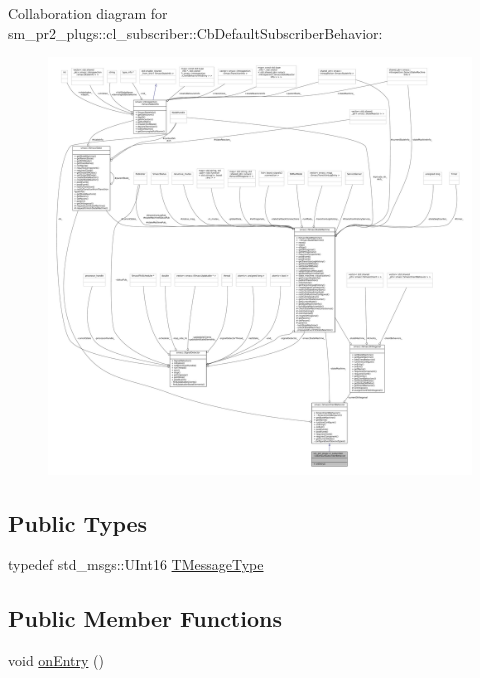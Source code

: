 Collaboration diagram for sm\+\_\+pr2\+\_\+plugs\+:\+:cl\+\_\+subscriber\+:\+:Cb\+Default\+Subscriber\+Behavior\+:
\nopagebreak
\begin{figure}[H]
\begin{center}
\leavevmode
\includegraphics[width=350pt]{classsm__pr2__plugs_1_1cl__subscriber_1_1CbDefaultSubscriberBehavior__coll__graph}
\end{center}
\end{figure}
\subsection*{Public Types}
\begin{DoxyCompactItemize}
\item 
typedef std\+\_\+msgs\+::\+U\+Int16 \hyperlink{classsm__pr2__plugs_1_1cl__subscriber_1_1CbDefaultSubscriberBehavior_a4f33f416661cd0fcde78377bad0070fb}{T\+Message\+Type}
\end{DoxyCompactItemize}
\subsection*{Public Member Functions}
\begin{DoxyCompactItemize}
\item 
void \hyperlink{classsm__pr2__plugs_1_1cl__subscriber_1_1CbDefaultSubscriberBehavior_ab4ac6d3ff4d7d919c12c35ce18c48990}{on\+Entry} ()
\end{DoxyCompactItemize}


